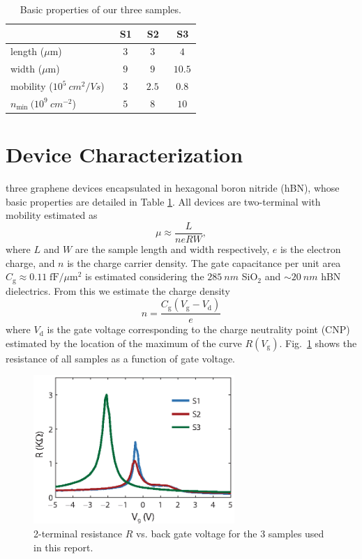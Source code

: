\begin{table}
\centering
\begin{tabular}{| l | c | c | c |}\hline
&\  S1 &\ S2 &\ S3 \\\hline
length ($\mu$m) &\ $3$ &\ $3$ &\ $4$ \\
width ($\mu$m) &\ $9$ &\ $9$ &\ $10.5$ \\
mobility ($10^5~cm^2/Vs$) &\ $3$ &\ $2.5$ &\ $0.8$ \\
$n_{\mathrm{min}}~(10^9~cm^{-2}$) &\ $5$ &\ $8$ &\ $10$ \\\hline
\end{tabular}
\caption{Basic properties of our three samples.}
\label{table:DF_table1}
\end{table}

\section{Device Characterization}\label{section:DF_devicechar}
 three graphene devices encapsulated in hexagonal boron nitride (hBN), whose basic properties are detailed in Table \ref{table:DF_table1}. All devices are two-terminal with mobility estimated as \begin{equation}
\mu\approx \frac{L}{neRW},
\end{equation}
where $L$ and $W$ are the sample length and width respectively, $e$ is the electron charge, and $n$ is the charge carrier density. The gate capacitance per unit area $C_{\mathrm{g}}\approx 0.11\; \mathrm{fF}/\mu \mathrm{m}^2$ is estimated considering the $285~nm$ SiO$_2$ and ${\sim 20}~nm$ hBN dielectrics.   From this we estimate the charge density \begin{equation}
n=\frac{C_{\mathrm{g}}(V_{\mathrm{g}}-V_{\mathrm{d}})}{e}
\end{equation} where $V_{\mathrm{d}}$ is the gate voltage corresponding to the charge neutrality point (CNP) estimated by the location of the maximum of the curve $R(V_{\mathrm{g}})$.   Fig.~\ref{fig:DF_S1} shows the resistance of all samples as a function of gate voltage.

\begin{figure}
\centering
\includegraphics[width=3in]{figures/Dirac_fluid/S1.eps}
\caption{2-terminal resistance $R$ vs. back gate voltage for the 3 samples used in this report.}
\label{fig:DF_S1}
\end{figure}

